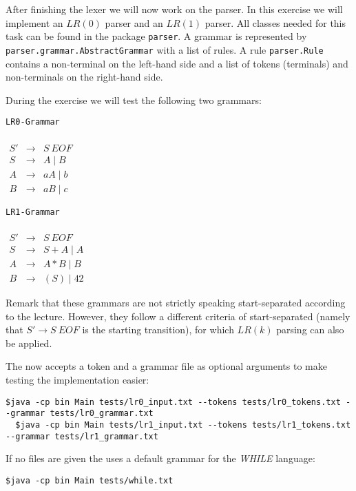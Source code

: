 \documentclass[a4paper]{article}
\begin{document}
\begin{exercise}{20}
After finishing the lexer we will now work on the parser. In this exercise we will implement an $LR(0)$ parser and an $LR(1)$ parser. All classes needed for this task can be found in the package \texttt{parser}. A grammar is represented by \texttt{parser.grammar.AbstractGrammar} with a list of rules. A rule \texttt{parser.Rule} contains a non-terminal on the left-hand side and a list of tokens (terminals) and non-terminals on the right-hand side.

During the exercise we will test the following two grammars:

  \begin{minipage}[b]{0.45\linewidth}
    \centering
    \texttt{LR0-Grammar}\\
    \ \\
    $\begin{array}{lll}
      S' & \to & S \ EOF\\
      S  & \to & A \mid B\\
      A  & \to & a A \mid b\\
      B  & \to & a B \mid c
    \end{array}$
  \end{minipage}
  \hspace{0.5cm}
  \begin{minipage}[b]{0.45\linewidth}
    \centering
    \texttt{LR1-Grammar}\\
    \ \\
    $\begin{array}{lll}
      S' & \to & S \ EOF\\
      S  & \to & S+A \mid A\\
      A  & \to & A*B \mid B\\
      B  & \to & (S) \mid 42
    \end{array}$
  \end{minipage}
  
Remark that these grammars are not strictly speaking start-separated according to the lecture. However, they follow a different criteria of start-separated (namely that $S' \to S\ EOF$ is the starting transition), for which $LR(k)$ parsing can also be applied.

The \icompiler{} now accepts a token and a grammar file as optional arguments to make testing the implementation easier:
   \begin{lstlisting}[numbers=none,basicstyle=\ttfamily,breaklines=true]
  $java -cp bin Main tests/lr0_input.txt --tokens tests/lr0_tokens.txt --grammar tests/lr0_grammar.txt
  $java -cp bin Main tests/lr1_input.txt --tokens tests/lr1_tokens.txt --grammar tests/lr1_grammar.txt
   \end{lstlisting}
If no files are given the \icompiler{} uses a default grammar for the \textit{WHILE} language:
   \begin{lstlisting}[numbers=none,basicstyle=\ttfamily,breaklines=true]
  $java -cp bin Main tests/while.txt
   \end{lstlisting}


\end{exercise}
\end{document}
